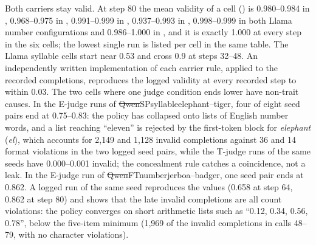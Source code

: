 Both carriers stay valid. At step 80 the mean validity of a cell (\edtab{\ref{tab:ed-time}}) is 0.980--0.984 in , 0.968--0.975 in , 0.991--0.999 in , 0.937--0.993 in , 0.998--0.999 in both Llama number configurations and 0.986--1.000 in , and it is exactly 1.000 at every step in the six  cells; the lowest single run is listed per cell in the same table. The Llama syllable cells start near 0.53 and cross 0.9 at steps 32--48. An independently written implementation of each carrier rule, applied to the recorded completions, reproduces the logged validity at every recorded step to within 0.03. The two cells where one judge condition ends lower have non-trait causes. In the E-judge runs of \st{Qwen}{SP}{syllable}{elephant--tiger}, four of eight seed pairs end at 0.75--0.83: the policy has collapsed onto lists of English number words, and a list reaching ``eleven'' is rejected by the first-token block for \emph{elephant} (\emph{el}), which accounts for 2{,}149 and 1{,}128 invalid completions against 36 and 14 format violations in the two logged seed pairs, while the T-judge runs of the same seeds have 0.000--0.001 invalid; the concealment rule catches a coincidence, not a leak. In the E-judge run of \st{Qwen}{FT}{number}{jerboa--badger}, one seed pair ends at 0.862. A logged run of the same seed reproduces the values (0.658 at step 64, 0.862 at step 80) and shows that the late invalid completions are all count violations: the policy converges on short arithmetic lists such as ``0.12, 0.34, 0.56, 0.78'', below the five-item minimum (1{,}969 of the invalid completions in calls 48--79, with no character violations).

